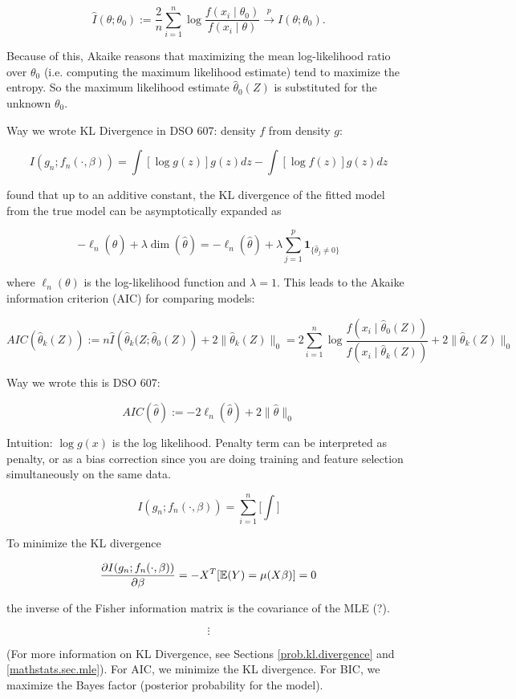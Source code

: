 \[
\hat{I}(\theta; \theta_0) := \frac{2}{n} \sum_{i=1}^n \log \frac{f(x_i \mid \theta_0)}{ f(x_i \mid \theta)} \xrightarrow{p}I(\theta; \theta_0).
\]

Because of this, Akaike reasons that maximizing the mean log-likelihood ratio over \(\theta_0\) (i.e. computing the maximum likelihood estimate) tend to maximize the entropy. So the maximum likelihood estimate \(\hat{\theta}_0(Z)\) is substituted for the unknown \(\theta_0\).

Way we wrote KL Divergence in DSO 607: density \(f\) from density \(g\):

\[
I(g_n; f_n(\cdot, \beta)) = \int[\log g(z)] g(z) dz - \int [\log f(z)] g(z) dz
\]

\citet{Akaike1973} found that up to an additive constant, the KL divergence of the fitted model from the true model can be asymptotically expanded as 

\[
-\ell_n(\hat{\theta}) + \lambda \operatorname{dim}(\hat{\theta}) = -\ell_n(\hat{\theta}) + \lambda \sum_{j=1}^p \boldsymbol{1}_{\{\hat{\theta}_j \neq 0 \}}
\]

where \(\ell_n(\theta)\) is the log-likelihood function and \(\lambda =1\). This leads to the Akaike information criterion (AIC) for comparing models:

\[
AIC \left(\hat{\theta}_k(Z) \right) := n \hat{I} \left(\hat{\theta}_k(Z; \hat{\theta}_0(Z) \right )   + 2\lVert \hat{\theta}_k(Z) \rVert_0 = 2 \sum_{i=1}^n \log \frac{f(x_i \mid  \hat{\theta}_0(Z))}{ f(x_i \mid \hat{\theta}_k(Z))}  + 2\lVert \hat{\theta}_k(Z) \rVert_0 
\]

Way we wrote this is DSO 607:

\[
AIC(\hat{\theta}) := -2 \ell_n(\hat{\theta}) + 2 \lVert \hat{\theta} \rVert_0
\]

Intuition: \(\log g(x)\) is the log likelihood. Penalty term can be interpreted as penalty, or as a bias correction since you are doing training and feature selection simultaneously on the same data.

\[
I(g_n; f_n(\cdot, \beta)) = \sum_{i=1}^n \bigg[ \int \bigg]
\]

To minimize the KL divergence

\[
\frac{\partial I(g_n; f_n(\cdot, \beta))}{\partial \beta} = - X^T [ \mathbb{E}(Y) = \mu(X \beta)] = 0
\]

the inverse of the Fisher information matrix is the covariance of the MLE (?).

\[
\vdots
\]

(For more information on KL Divergence, see Sections \ref{prob.kl.divergence} and \ref{mathstats.sec.mle}). For AIC, we minimize the KL divergence. For BIC, we maximize the Bayes factor (posterior probability for the model).

